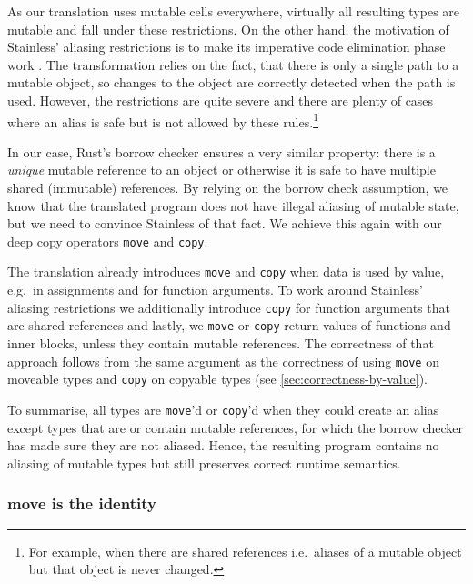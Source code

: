 As our translation uses mutable cells everywhere, virtually all
resulting types are mutable and fall under these restrictions. On the
other hand, the motivation of Stainless' aliasing restrictions is to
make its imperative code elimination phase work \cite{regb}. The
transformation relies on the fact, that there is only a single path to a
mutable object, so changes to the object are correctly detected when the
path is used. However, the restrictions are quite severe and there are
plenty of cases where an alias is safe but is not allowed by these
rules.\footnote{For example, when there are shared references i.e.~aliases of a
mutable object but that object is never changed.}

In our case, Rust's borrow checker ensures a very similar property:
there is a \emph{unique} mutable reference to an object or otherwise it
is safe to have multiple shared (immutable) references. By relying on
the borrow check assumption, we know that the translated program does
not have illegal aliasing of mutable state, but we need to convince
Stainless of that fact. We achieve this again with our deep copy
operators \passthrough{\lstinline!move!} and
\passthrough{\lstinline!copy!}.

The translation already introduces \passthrough{\lstinline!move!} and
\passthrough{\lstinline!copy!} when data is used by value, e.g.~in
assignments and for function arguments. To work around Stainless'
aliasing restrictions we additionally introduce
\passthrough{\lstinline!copy!} for function arguments that are shared
references and lastly, we \passthrough{\lstinline!move!} or
\passthrough{\lstinline!copy!} return values of functions and inner
blocks, unless they contain mutable references. The correctness of that
approach follows from the same argument as the correctness of using
\passthrough{\lstinline!move!} on moveable types and
\passthrough{\lstinline!copy!} on copyable types (see \autoref{sec:correctness-by-value}).

To summarise, all types are \passthrough{\lstinline!move!}'d or
\passthrough{\lstinline!copy!}'d when they could create an alias except
types that are or contain mutable references, for which the borrow
checker has made sure they are not aliased. Hence, the resulting program
contains no aliasing of mutable types but still preserves correct
runtime semantics.

\subsubsection{move is the identity}

